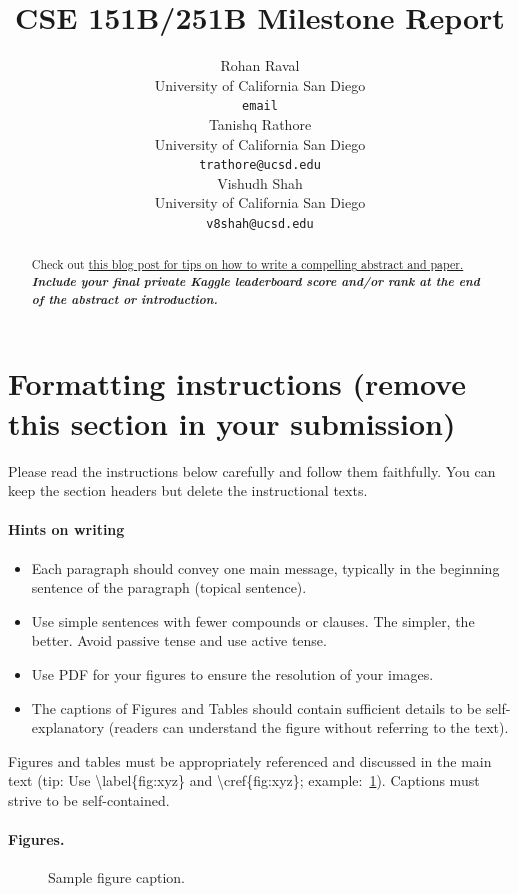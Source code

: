 \documentclass{article}
\title{
CSE 151B/251B Milestone Report
\\
}
\author{%
  Rohan Raval \\
  University of California San Diego \\
  \texttt{email} \\
  \And
  Tanishq Rathore \\
  University of California San Diego \\
  \texttt{trathore@ucsd.edu} \\
  \AND
  Vishudh Shah
  \\
  University of California San Diego \\
  \texttt{v8shah@ucsd.edu} \\
}
\begin{document}
\maketitle


\begin{abstract}
Check out \href{https://www.alignmentforum.org/posts/eJGptPbbFPZGLpjsp/highly-opinionated-advice-on-how-to-write-ml-papers#Abstract}{this blog post for tips on how to write a compelling abstract and paper.} \textbf{\textit{Include your final private Kaggle leaderboard score and/or rank at the end of the abstract or introduction.}}
\end{abstract}

\section*{Formatting instructions (remove this section in your submission)}
Please read the instructions below carefully and follow them faithfully. You can keep the section headers but delete the instructional texts.
\paragraph{Hints on writing}
\begin{itemize}
    \item Each paragraph should convey one main message, typically in the beginning sentence of the paragraph (topical sentence).
    \item  Use simple sentences with fewer compounds or clauses. The simpler, the better. Avoid passive tense and use active tense.
    \item Use PDF for your figures to ensure the resolution of your images.
    \item The captions of Figures and Tables should contain sufficient details to be self-explanatory (readers can understand the figure without referring to the text).
\end{itemize}


Figures and tables must be appropriately referenced and discussed in the main text (tip: Use \textbackslash label\{fig:xyz\} and \textbackslash cref\{fig:xyz\}; example:~\cref{fig:example}). Captions must strive to be self-contained.
\paragraph{Figures.}
\begin{figure} %
  \vspace{-4mm}  %
  \centering
  \fbox{\rule[-.5cm]{0cm}{4cm} \rule[-.5cm]{4cm}{0cm}}
  \caption{Sample figure caption.}
  \label{fig:example}
\end{figure}
\end{document}
